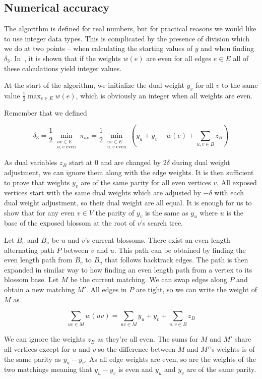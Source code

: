 \subsection{Numerical accuracy}

The algorithm is defined for real numbers, but for practical reasons we would like to use integer data types. This is complicated by the presence of division which we do at two points – when calculating the starting values of $y$ and when finding $\delta_3$. In~\cite{gabow1974implementation}, it is shown that if the weights $w(e)$ are even for all edges $e\in E$ all of these calculations yield integer values.

At the start of the algorithm, we initialize the dual weight $y_v$ for all $v$ to the same value $\frac{1}{2}\max_{e \in E} w(e)$, which is obviously an integer when all weights are even.

Remember that we defined

\[\delta_3=\frac{1}{2}\min_{\substack{uv\in E \\ \text{$u, v$ even}}} \pi_{uv} = \frac{1}{2}\min_{\substack{uv\in E \\ \text{$u, v$ even}}} \left(y_u + y_v - w(e) + \sum_{u, v \in B} z_B\right)\] 

As dual variables $z_B$ start at $0$ and are changed by $2\delta$ during dual weight adjustment, we can ignore them along with the edge weights. It is then sufficient to prove that weights $y_v$ are of the same parity for all even vertices $v$. All exposed vertices start with the same dual weights which are adjusted by $-\delta$ with each dual weight adjustment, so their dual weight are all equal. It is enough for us to show that for any even $v \in V$ the parity of $y_v$ is the same as $y_u$ where $u$ is the base of the exposed blossom at the root of $v$'s search tree. 

Let $B_v$ and $B_u$ be $u$ and $v$'s current blossoms. There exist an even length alternating path $P$ between $v$ and $u$. This path can be obtained by finding the even length path from $B_v$ to $B_u$ that follows backtrack edges. The path is then expanded in similar way to how finding an even length path from a vertex to its blossom base. Let $M$ be the current matching. We can swap edges along $P$ and obtain a new matching $M'$. All edges in $P$ are tight, so we can write the weight of $M$ as

\[\sum_{uv \in M} w(uv) = \sum_{uv \in M} y_u + y_v + \sum_{u, v \in B} z_B\]

We can ignore the weights $z_B$ as they're all even. The sums for $M$ and $M'$ share all vertices except for $u$ and $v$ so the difference between $M$ and $M'$'s weights is of the same parity as $y_u - y_v$. As all edge weights are even, so are the weights of the two matchings meaning that $y_u - y_v$ is even and $y_u$ and $y_v$ are of the same parity.

